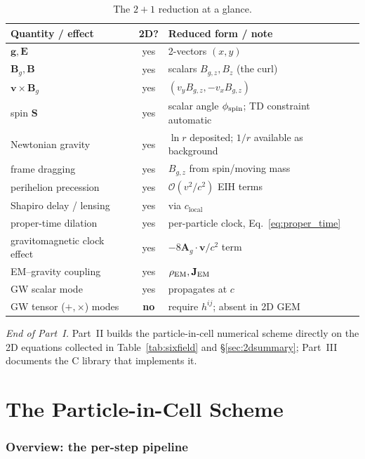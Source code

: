 \documentclass[11pt]{article}
\newcommand{\Ag}{\mathbf{A}_g}             %
\newcommand{\vv}[1]{\mathbf{#1}}           %
\newcommand{\order}[1]{\mathcal{O}(#1)}    %
\newcommand{\clocal}{c_{\mathrm{local}}}
\newcommand{\Bg}{\vv{B}_g}
\begin{document}
\begin{table}[h]
\centering
\begin{tabular}{@{}L{4.6cm}cL{6.4cm}@{}}
\toprule
\textbf{Quantity / effect} & \textbf{2D?} & \textbf{Reduced form / note} \\
\midrule
$\vv{g},\vv{E}$               & yes & 2-vectors $(x,y)$ \\
$\Bg,\vv{B}$                  & yes & scalars $B_{g,z},B_z$ (the curl) \\
$\vv{v}\times\Bg$             & yes & $(v_yB_{g,z},-v_xB_{g,z})$ \\
spin $\vv{S}$                 & yes & scalar angle $\phi_{\rm spin}$; TD constraint automatic \\
Newtonian gravity            & yes & $\ln r$ deposited; $1/r$ available as background \\
frame dragging               & yes & $B_{g,z}$ from spin/moving mass \\
perihelion precession        & yes & $\order{v^2/c^2}$ EIH terms \\
Shapiro delay / lensing      & yes & via $\clocal$ \\
proper-time dilation         & yes & per-particle clock, Eq.~\eqref{eq:proper_time} \\
gravitomagnetic clock effect & yes & $-8\Ag\cdot\vv{v}/c^2$ term \\
EM--gravity coupling         & yes & $\rho_{\rm EM},\vv{J}_{\rm EM}$ \\
GW scalar mode               & yes & propagates at $c$ \\
GW tensor ($+,\times$) modes & \textbf{no} & require $h^{ij}$; absent in 2D GEM \\
\bottomrule
\end{tabular}
\caption{The $2{+}1$ reduction at a glance.}
\label{tab:2d}
\end{table}

\bigskip
\noindent\textit{End of Part~I.}  Part~II builds the particle-in-cell numerical
scheme directly on the 2D equations collected in
Table~\ref{tab:sixfield} and \S\ref{sec:2dsummary}; Part~III documents the C
library that implements it.

\part{The Particle-in-Cell Scheme}

\section{Overview: the per-step pipeline}
\label{sec:pipeline}
\end{document}
